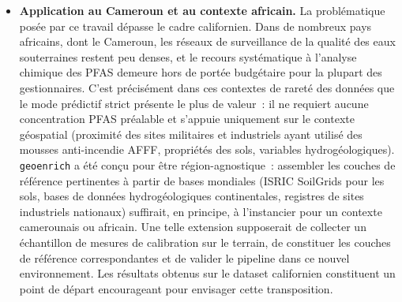 \begin{itemize}
    \item \textbf{Application au Cameroun et au contexte africain.} La probl\'ematique pos\'ee par ce travail d\'epasse le cadre californien. Dans de nombreux pays africains, dont le Cameroun, les r\'eseaux de surveillance de la qualit\'e des eaux souterraines restent peu denses, et le recours syst\'ematique \`a l'analyse chimique des PFAS demeure hors de port\'ee budg\'etaire pour la plupart des gestionnaires. C'est pr\'ecis\'ement dans ces contextes de raret\'e des donn\'ees que le mode pr\'edictif strict pr\'esente le plus de valeur~: il ne requiert aucune concentration PFAS pr\'ealable et s'appuie uniquement sur le contexte g\'eospatial (proximit\'e des sites militaires et industriels ayant utilis\'e des mousses anti-incendie AFFF, propri\'et\'es des sols, variables hydrog\'eologiques). \texttt{geoenrich} a \'et\'e con\c{c}u pour \^etre r\'egion-agnostique~: assembler les couches de r\'ef\'erence pertinentes \`a partir de bases mondiales (ISRIC SoilGrids pour les sols, bases de donn\'ees hydrog\'eologiques continentales, registres de sites industriels nationaux) suffirait, en principe, \`a l'instancier pour un contexte camerounais ou africain. Une telle extension supposerait de collecter un \'echantillon de mesures de calibration sur le terrain, de constituer les couches de r\'ef\'erence correspondantes et de valider le pipeline dans ce nouvel environnement. Les r\'esultats obtenus sur le dataset californien constituent un point de d\'epart encourageant pour envisager cette transposition.

\end{itemize}


\myCleanStarChapterEnd
